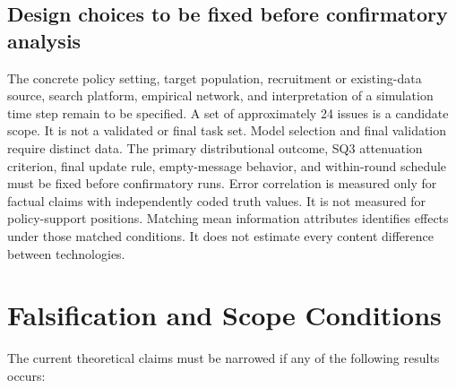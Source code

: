 \documentclass[11pt,a4paper]{article}
\begin{document}
\subsection{Design choices to be fixed before confirmatory analysis}

The concrete policy setting, target population, recruitment or existing-data source, search platform, empirical network, and interpretation of a simulation time step remain to be specified. A set of approximately 24 issues is a candidate scope. It is not a validated or final task set. Model selection and final validation require distinct data. The primary distributional outcome, SQ3 attenuation criterion, final update rule, empty-message behavior, and within-round schedule must be fixed before confirmatory runs. Error correlation is measured only for factual claims with independently coded truth values. It is not measured for policy-support positions. Matching mean information attributes identifies effects under those matched conditions. It does not estimate every content difference between technologies.

\section{Falsification and Scope Conditions}

The current theoretical claims must be narrowed if any of the following results occurs:
\end{document}
